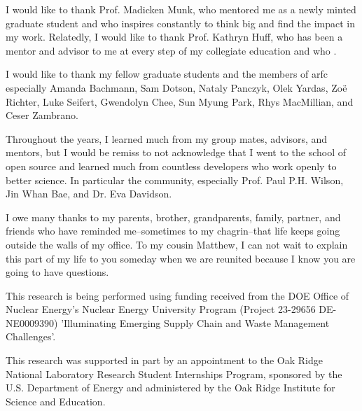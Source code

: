 I would like to thank Prof. Madicken Munk, who mentored me as a newly minted graduate student and who inspires constantly to think big and find the impact in my work. Relatedly, I would like to thank Prof. Kathryn Huff, who has been a mentor and advisor to me at every step of my collegiate education and who .

I would like to thank my fellow graduate students and the members of
\gls{arfc} especially Amanda Bachmann, Sam Dotson, Nataly Panczyk, Olek Yardas,
Zo\"{e} Richter, Luke Seifert, Gwendolyn Chee, Sun Myung Park, Rhys MacMillian,
and Ceser Zambrano.

Throughout the years, I learned much from my group mates, advisors, and
mentors, but I would be remiss to not acknowledge that I went to the school of
open source and learned much from countless developers who work openly to
better science. In particular the \cyclus community, especially Prof. Paul P.H.
Wilson, Jin Whan Bae, and Dr. Eva Davidson.

I owe many thanks to my parents, brother, grandparents, family, partner, and
friends who have reminded me--sometimes to my chagrin--that life keeps going
outside the walls of my office. To my cousin Matthew, I can not wait to explain
this part of my life to you someday when we are reunited because I know you are
going to have questions.

This research is being performed using funding received from the DOE Office of
Nuclear Energy's Nuclear Energy University Program (Project 23-29656
DE-NE0009390) 'Illuminating Emerging Supply Chain and Waste Management
Challenges'.

This research was supported in part by an appointment to the Oak Ridge National
Laboratory Research Student Internships Program, sponsored by the U.S.
Department of Energy and administered by the Oak Ridge Institute for Science
and Education.